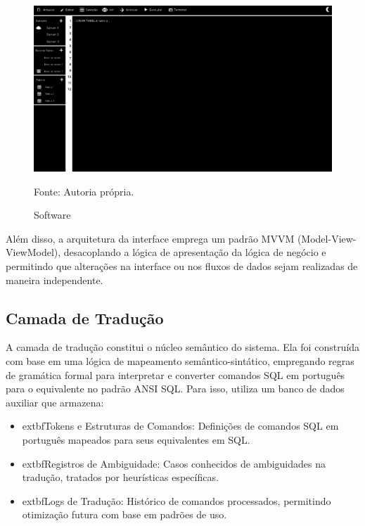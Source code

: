 \begin{figure}[H]
    \centering
    \includegraphics[width=1\textwidth]{figuras/UNBSQL.eps}
    \caption{Software}
    Fonte: Autoria própria.
    \label{fig:software_figma}
\end{figure}

Além disso, a arquitetura da interface emprega um padrão MVVM (Model-View-ViewModel), desacoplando a lógica de apresentação da lógica de negócio e permitindo que alterações na interface ou nos fluxos de dados sejam realizadas de maneira independente.

\subsection{Camada de Tradução}
A camada de tradução constitui o núcleo semântico do sistema. Ela foi construída com base em uma lógica de mapeamento semântico-sintático, empregando regras de gramática formal para interpretar e converter comandos SQL em português para o equivalente no padrão ANSI SQL. Para isso, utiliza um banco de dados auxiliar que armazena:

\begin{itemize}
    \item 	extbf{Tokens e Estruturas de Comandos}: Definições de comandos SQL em português mapeados para seus equivalentes em SQL.
    \item 	extbf{Registros de Ambiguidade}: Casos conhecidos de ambiguidades na tradução, tratados por heurísticas específicas.
    \item 	extbf{Logs de Tradução}: Histórico de comandos processados, permitindo otimização futura com base em padrões de uso.
\end{itemize}

